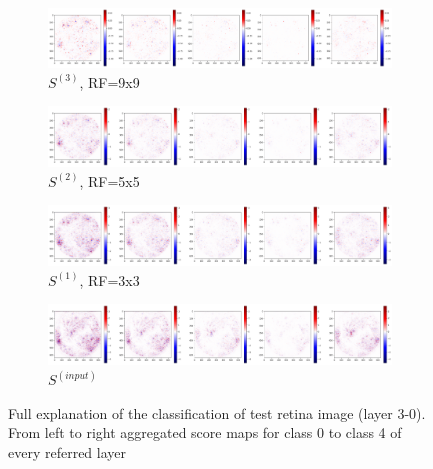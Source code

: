 \documentclass[preprint]{elsarticle}
\theoremstyle{definition} %
\theoremstyle{remark}
\begin{document}
\begin{figure}[h!]
	\centering
	\begin{subfigure}[b]{\textwidth}
		\includegraphics[width=\textwidth]{figures/score_prop_23713_left/score_rf9.png}
		\caption{$S^{(3)}$, RF=9x9}
		\label{fig:score_rf9}
	\end{subfigure}

	\begin{subfigure}[b]{\textwidth}
		\includegraphics[width=\textwidth]{figures/score_prop_23713_left/score_rf5.png}
		\caption{$S^{(2)}$, RF=5x5}
		\label{fig:score_rf5}
	\end{subfigure}
	
	\begin{subfigure}[b]{\textwidth}
		\includegraphics[width=\textwidth]{figures/score_prop_23713_left/score_rf3.png}
		\caption{$S^{(1)}$, RF=3x3}
		\label{fig:score_rf3}
	\end{subfigure}
	
	\begin{subfigure}[b]{\textwidth}
		\includegraphics[width=\textwidth]{figures/score_prop_23713_left/score_input.png}
		\caption{$S^{(input)}$}
		\label{fig:score_input}
	\end{subfigure}

	\caption{Full explanation of the classification of test retina image (layer 3-0). From left to right aggregated score maps for class 0 to class 4 of every referred layer}
	\label{fig:test1_score_explanation3_rf}
\end{figure}
\end{document}
